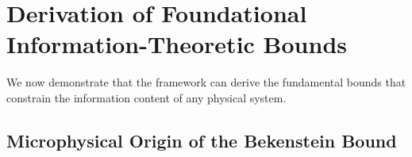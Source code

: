 \documentclass[11pt, letterpaper]{report}
\theoremstyle{plain} %
\theoremstyle{definition} %
\theoremstyle{remark} %
\begin{document}
\section{Derivation of Foundational Information-Theoretic Bounds}
\label{sec:verify_bounds}

We now demonstrate that the framework can derive the fundamental bounds that constrain the information content of any physical system.

\subsection{Microphysical Origin of the Bekenstein Bound}
\label{subsec:verify_bekenstein}
\end{document}
